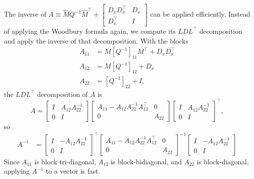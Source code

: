 \documentclass{article}
\begin{document}
The inverse of $A\equiv \hat{M} Q^{-1} \hat{M}^\top + \begin{bmatrix}
        D_x D_x^\top & D_x \\ D_x^\top & I
    \end{bmatrix}
$ can be applied efficiently. Instead of applying the Woodbury formula again, we compute its $LDL^\top$ decomposition and apply the inverse of that decomposition.
With the blocks
\begin{align}
    A_{11} & = M \left[Q^{-1}\right]_{11} M^\top +D_x D_x^\top \nonumber \\
    A_{12} & = M\left[Q^{-1}\right]_{12} + D_x \nonumber                 \\
    A_{22} & = \left[Q^{-1}\right]_{22} + I,
\end{align}
the $LDL^\top$ decomposition of $A$ is
\begin{equation}
    A       =
    \begin{bmatrix}
        I & A_{12} A_{22}^{-1} \\ 0 & I
    \end{bmatrix}
    \begin{bmatrix}
        A_{11} - A_{12} A_{22}^{-1} A_{12}^\top & 0      \\
        0                                       & A_{22}
    \end{bmatrix}
    \begin{bmatrix}
        I & A_{12} A_{22}^{-1} \\ 0 & I
    \end{bmatrix}
    ^\top,
\end{equation}
so
\begin{align}
    A^{-1} & = \begin{bmatrix}
        I & -A_{12} A_{22}^{-1} \\ 0 & I
    \end{bmatrix}
    ^\top
    \begin{bmatrix}
        A_{11} - A_{12} A_{22}^{-1} A_{12}^\top & 0      \\
        0                                       & A_{22}
    \end{bmatrix}
    ^{-1}
    \begin{bmatrix}
        I & -A_{12} A_{22}^{-1} \\ 0 & I
    \end{bmatrix}
\end{align}
Since $A_{11}$ is block tri-diagonal, $A_{12}$ is block-bidiagonal, and $A_{22}$ is block-diagonal, applying $A^{-1}$ to a vector is fast.
\end{document}
